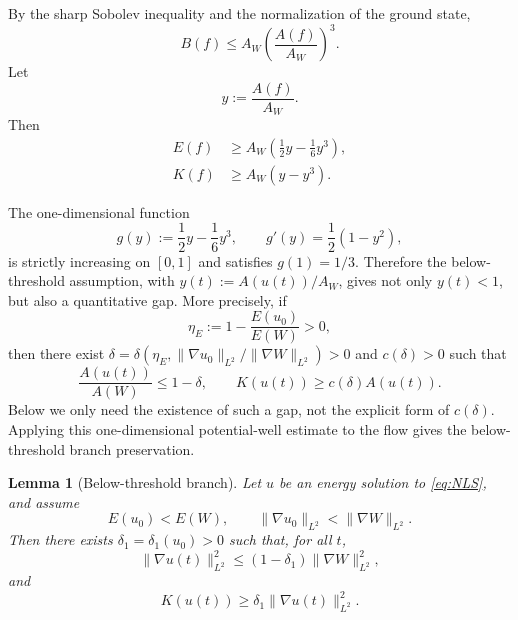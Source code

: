 \documentclass[10pt,a4paper]{amsart}
\numberwithin{equation}{section}
\newtheorem{lemma}[theorem]{Lemma}
\begin{document}
By the sharp Sobolev inequality and the normalization of the ground state,
\begin{equation*}
  B(f)\le A_W\left(\frac{A(f)}{A_W}\right)^3.
\end{equation*}
Let
\begin{equation*}
  y:=\frac{A(f)}{A_W}.
\end{equation*}
Then
\begin{align}
  E(f)&\ge A_W\left(\frac12y-\frac16y^3\right),\label{eq:E-lower-y}\\
  K(f)&\ge A_W(y-y^3).\label{eq:K-lower-y}
\end{align}

The one-dimensional function
\begin{equation*}
  g(y):=\frac12y-\frac16y^3,
  \qquad g'(y)=\frac12(1-y^2),
\end{equation*}
is strictly increasing on $[0,1]$ and satisfies $g(1)=1/3$. Therefore the below-threshold assumption, with $y(t):=A(u(t))/A_W$, gives not only $y(t)<1$, but also a quantitative gap. More precisely, if
\begin{equation*}
  \eta_E:=1-\frac{E(u_0)}{E(W)}>0,
\end{equation*}
then there exist $\delta=\delta(\eta_E,\|\nabla u_0\|_{L^2}/\|\nabla W\|_{L^2})>0$ and $c(\delta)>0$ such that
\begin{equation*}
  \frac{A(u(t))}{A(W)}\le1-\delta,
  \qquad K(u(t))\ge c(\delta)A(u(t)).
\end{equation*}
Below we only need the existence of such a gap, not the explicit form of $c(\delta)$. Applying this one-dimensional potential-well estimate to the flow gives the below-threshold branch preservation.

\begin{lemma}[Below-threshold branch]\label{lem:coercivity-branch}
Let $u$ be an energy solution to \eqref{eq:NLS}, and assume
\begin{equation*}
  E(u_0)<E(W),
  \qquad \|\nabla u_0\|_{L^2}<\|\nabla W\|_{L^2}.
\end{equation*}
Then there exists $\delta_1=\delta_1(u_0)>0$ such that, for all $t$,
\begin{equation*}
  \|\nabla u(t)\|_{L^2}^2\le(1-\delta_1)\|\nabla W\|_{L^2}^2,
\end{equation*}
and
\begin{equation}\label{eq:K-coercive-gradient}
  K(u(t))\ge\delta_1\|\nabla u(t)\|_{L^2}^2.
\end{equation}
\end{lemma}
\end{document}
